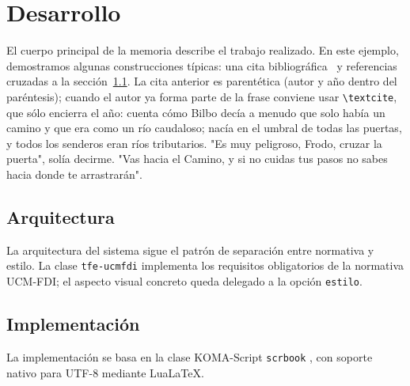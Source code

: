 \chapter{Desarrollo}

El cuerpo principal de la memoria describe el trabajo realizado.
En este ejemplo, demostramos algunas construcciones típicas: una
cita bibliográfica~\parencite{knuth1986} y referencias cruzadas a
la sección~\ref{sec:arquitectura}. La cita anterior es parentética
(autor y año dentro del paréntesis); cuando el autor ya forma parte
de la frase conviene usar \verb|\textcite|, que sólo encierra el
año: \textcite{tolkien1954lord} cuenta cómo Bilbo decía a menudo
que solo había un camino y que era como un río caudaloso; nacía
en el umbral de todas las puertas, y todos los senderos eran ríos
tributarios. "Es muy peligroso, Frodo, cruzar la puerta", solía
decirme. "Vas hacia el Camino, y si no cuidas tus pasos no sabes
hacia donde te arrastrarán".

\section{Arquitectura}
\label{sec:arquitectura}

La arquitectura del sistema sigue el patrón de separación entre
normativa y estilo. La clase \texttt{tfe-ucmfdi} implementa los
requisitos obligatorios de la normativa UCM-FDI; el aspecto
visual concreto queda delegado a la opción \texttt{estilo}.

\section{Implementación}

La implementación se basa en la clase KOMA-Script
\texttt{scrbook} \autocite{kohm2004koma}, con soporte nativo para UTF-8 mediante
LuaLaTeX.
